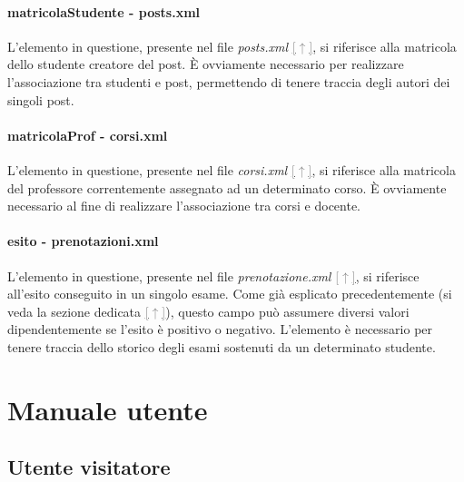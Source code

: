 \documentclass [a4paper,11pt]{book}
\begin{document}
\medskip

\subsubsection{matricolaStudente - posts.xml}

L'elemento in questione, presente nel file \emph{posts.xml} \hyperref[sec:posts]{\textcolor{gray}{[$\uparrow$]}}, si riferisce alla matricola dello studente creatore del post. È ovviamente necessario per realizzare l'associazione tra studenti e post, permettendo di tenere traccia degli autori dei singoli post.

\medskip

\subsubsection{matricolaProf - corsi.xml}

L'elemento in questione, presente nel file \emph{corsi.xml} \hyperref[sec:corsi]{\textcolor{gray}{[$\uparrow$]}}, si riferisce alla matricola del professore correntemente assegnato ad un determinato corso. È ovviamente necessario al fine di realizzare l'associazione tra corsi e docente.

\medskip

\subsubsection{esito - prenotazioni.xml}

L'elemento in questione, presente nel file \emph{prenotazione.xml} \hyperref[sec:prenotazioni]{\textcolor{gray}{[$\uparrow$]}}, si riferisce all'esito conseguito in un singolo esame. Come già esplicato precedentemente (si veda la sezione dedicata \hyperref[sec:esito]{\textcolor{gray}{[$\uparrow$]}}), questo campo può assumere diversi valori dipendentemente se l'esito è positivo o negativo. L'elemento è necessario per tenere traccia dello storico degli esami sostenuti da un determinato studente.

\medskip

\chapter{Manuale utente}

\section{Utente visitatore}
\end{document}
